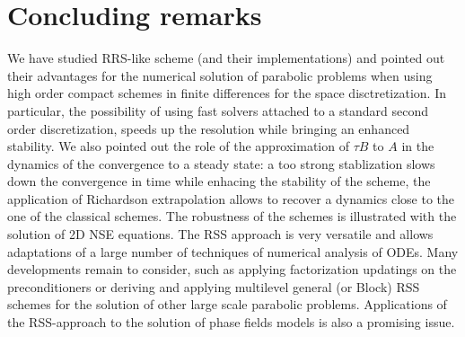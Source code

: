 {\section{Concluding remarks}
We have studied RRS-like scheme (and their implementations) and pointed out their advantages for the numerical solution of parabolic problems when using high order compact schemes in finite differences for the space disctretization. In particular, the possibility of using fast solvers attached to a standard second order discretization, speeds up the resolution while bringing an enhanced stability.
We also pointed out the role of the
approximation of $\tau B$ to $A$ in the dynamics of the convergence to a steady state: a too strong 
stablization slows down the convergence in time while enhacing the stability of the scheme, the application of Richardson extrapolation allows to recover a dynamics close to the one of the classical schemes.
The robustness of the schemes is illustrated with the solution of 2D NSE equations.
The RSS approach is very versatile and allows adaptations of a large number of techniques of numerical analysis of ODEs. Many developments remain to consider, such as applying factorization updatings on the preconditioners or deriving and applying multilevel general (or Block) RSS schemes for the  solution of other large scale parabolic problems. Applications of the RSS-approach to the solution of phase fields models is also a promising issue. 

}
